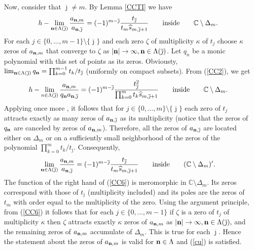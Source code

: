 \documentclass[10pt,a4paper]{article}
\theoremstyle{definition}
\theoremstyle{remark}
\numberwithin{equation}{section}
\begin{document}
Now, consider that  $ \overline{\jmath} \neq m$. By Lemma \ref{CCTI} we have
\begin{equation}\label{CC2}
h-\lim_{{\bf n}\in \Lambda(\overline{\jmath})}\frac{a_{{\bf n}, m}}{a_{{\bf n},\overline{\jmath}}} = (-1)^{m-\overline{\jmath}}\frac{t_{\overline{\jmath}}}{t_{m}\widehat{s}_{m,\overline{\jmath}+1}}\qquad \mbox{inside} \qquad \mathbb{C} \setminus \Delta_m.
\end{equation}
For each $j \in \{0,\ldots,m-1\} \setminus \{\overline{\jmath}\}$ and each zero $\zeta$ of multiplicity $\kappa$ of $t_j$ choose $\kappa$ zeros of $a_{{\bf n},m}$ that converge to $\zeta$ as $|{\bf n}| \to \infty, {\bf n} \in \Lambda(\overline{\jmath})$. Let $q_n$ be a monic polynomial with this set of points as its zeros. Obviousty, $\lim_{{\bf n} \in \Lambda(\overline{\jmath})} q_{\bf n}= \prod_{k=0}^{m-1}t_k/t_{\overline{\jmath}}$ (uniformly on compact subsets). From (\ref{CC2}), we get
\begin{equation}\label{CC5}
h-\lim_{n\in \Lambda(\overline{\jmath})}\frac{a_{{\bf n}, m}}{q_{\bf n}a_{{\bf n},\overline{\jmath}}} = (-1)^{m-\overline{\jmath}}\frac{t^2_{\overline{\jmath}}}{\prod_{k=0}^m t_{k}\widehat{s}_{m,\overline{\jmath}+1}}\qquad \mbox{inside} \qquad \mathbb{C} \setminus \Delta_m.
\end{equation}
Applying once more \cite[Lemma 1]{Gon}, it follows that for $j\in \{0,\ldots,m\} \setminus \{{\overline{\jmath}}\}$ each zero of $t_j$ attracts exactly as many zeros of $a_{{\bf n},\overline{\jmath}}$ as its multiplicity (notice that the zeros of $q_{\bf n}$ are canceled by zeros of $a_{{\bf n},m}$). Therefore, all the zeros of $a_{{\bf n},\overline{\jmath}}$ are located either on $\Delta_m$ or on a sufficiently small neighborhood of the zeros of the polynomial $\prod_{k=0}^m t_{k}/t_{\overline{\jmath}}$. Consequently,
\begin{equation}\label{CC6}
\lim_{{\bf n}\in \Lambda(\overline{\jmath})}\frac{a_{{\bf n}, m}}{a_{{\bf n},\overline{\jmath}}} = (-1)^{m-\overline{\jmath}}\frac{t_{\overline{\jmath}}}{t_{m}\widehat{s}_{m,\overline{\jmath}+1}}\qquad \mbox{inside} \qquad (\mathbb{C} \setminus \Delta_m)^{\prime }.
\end{equation}
The function of the right hand of (\ref{CC6}) is meromorphic in $\mathbb{C} \setminus \Delta_m$. Its zeros correspond with those of  $t_{\overline{\jmath}}$ (multiplicity included) and its poles are the zeros of $t_m$ with order equal to the multiplicity of the zero. Using the argument principle, from (\ref{CC6}) it follows that for each $j\in \{0,\ldots,m-1\}$ if $\zeta$ is
a zero of $t_j$ of multiplicity $\kappa$ then $\zeta$ attracts exactly $\kappa$ zeros of $a_{{\bf n},m}$ as $|{\bf n}| \to \infty, {\bf n} \in \Lambda(\overline{\jmath}),$ and the remaining zeros of $a_{{\bf n},m}$ accumulate of $\Delta_m$. This is true for each $\overline{\jmath}$. Hence the statement about the zeros of $a_{{\bf n},m}$ is valid for ${\bf n} \in \Lambda$ and (\ref{cu}) is satisfied.
\end{document}
